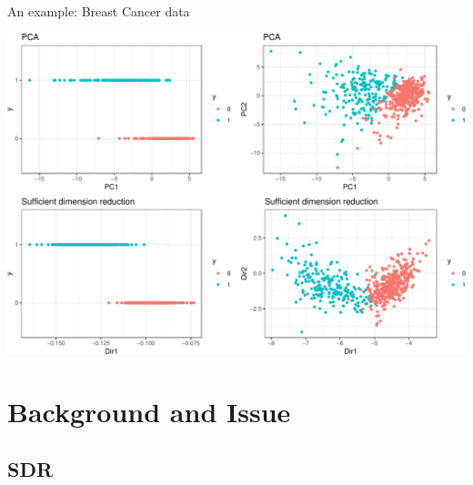 \documentclass[ignorenonframetext,]{beamer}
\begin{document}
\begin{frame}{An example: Breast Cancer data}

\begin{center}\includegraphics{SDR_reps_slides_final_merck_files/figure-beamer/unnamed-chunk-2-1} \end{center}

\end{frame}

\section{Background and Issue}\label{background-and-issue}

\subsection{SDR}\label{sdr}
\end{document}

